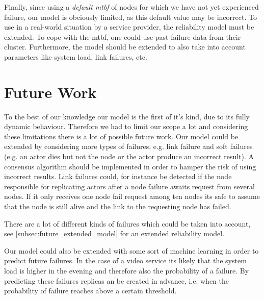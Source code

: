 \documentclass{cslthse-msc}
\begin{document}
Finally, since using a \emph{default mtbf} of nodes for which we have not yet experienced failure, our model is obciously limited, as this default value may be incorrect. To use in a real-world situation by a service provider, the reliability model must be extended. To cope with the mtbf, one could use past failure data from their cluster. Furthermore, the model should be extended to also take into account parameters like system load, link failures, etc. 


\chapter{Future Work} \label{ch:future_work}
To the best of our knowledge our model is the first of it's kind, due to its fully dynamic behaviour. Therefore we had to limit our scope a lot and considering these limitations there is a lot of possible future work. Our model could be extended by considering more types of failures, e.g. link failure and soft failures (e.g. an actor dies but not the node or the actor produce an incorrect result). A consensus algorithm should be implemented in order to hamper the risk of using incorrect results. Link failures could, for instance be detected if the node responsible for replicating actors after a node failure awaits request from several nodes. If it only receives one node fail request among ten nodes its safe to assume that the node is still alive and the link to the requesting node has failed.

There are a lot of different kinds of failures which could be taken into account, see \autoref{subsec:future_extended_model} for an extended reliability model.

Our model could also be extended with some sort of machine learning in order to predict future failures. In the case of a video service its likely that the system load is higher in the evening and therefore also the probability of a failure. By predicting these failures replicas an be created in advance, i.e. when the probability of failure reaches above a certain threshold.
\end{document}
